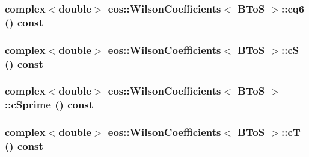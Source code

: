 \label{structeos_1_1WilsonCoefficients_3_01BToS_01_4_a73655ba58242bc15ecc8f097ec9abadd}
\hypertarget{structeos_1_1WilsonCoefficients_3_01BToS_01_4_a454eb97a2a032d55a656e0103d4cffa7}{
\subsubsection[{cq6}]{\setlength{\rightskip}{0pt plus 5cm}complex$<$double$>$ eos::WilsonCoefficients$<$ {\bf BToS} $>$::cq6 () const}}
\label{structeos_1_1WilsonCoefficients_3_01BToS_01_4_a454eb97a2a032d55a656e0103d4cffa7}
\hypertarget{structeos_1_1WilsonCoefficients_3_01BToS_01_4_afb6218a0c941a2c158753e8977ceca2a}{
\subsubsection[{cS}]{\setlength{\rightskip}{0pt plus 5cm}complex$<$double$>$ eos::WilsonCoefficients$<$ {\bf BToS} $>$::cS () const}}
\label{structeos_1_1WilsonCoefficients_3_01BToS_01_4_afb6218a0c941a2c158753e8977ceca2a}
\hypertarget{structeos_1_1WilsonCoefficients_3_01BToS_01_4_afee3b55a164362636ff1bdfcea0d869f}{
\subsubsection[{cSprime}]{\setlength{\rightskip}{0pt plus 5cm}complex$<$double$>$ eos::WilsonCoefficients$<$ {\bf BToS} $>$::cSprime () const}}
\label{structeos_1_1WilsonCoefficients_3_01BToS_01_4_afee3b55a164362636ff1bdfcea0d869f}
\hypertarget{structeos_1_1WilsonCoefficients_3_01BToS_01_4_a36a8fb3dc528761824bcced340aecbae}{
\subsubsection[{cT}]{\setlength{\rightskip}{0pt plus 5cm}complex$<$double$>$ eos::WilsonCoefficients$<$ {\bf BToS} $>$::cT () const}}
